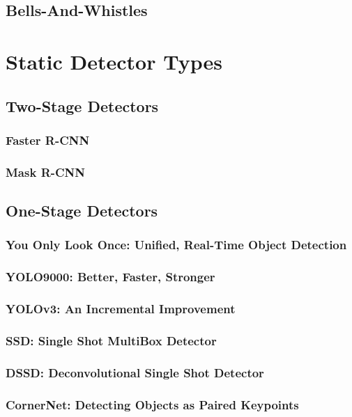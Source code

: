 \documentclass[12pt, letterpaper, twoside]{article}
\begin{document}
\subsection{Bells-And-Whistles}

\section{Static Detector Types}

\vfill

\subsection{Two-Stage Detectors}
\subsubsection{Faster R-CNN}
\subsubsection{Mask R-CNN}

\subsection{One-Stage Detectors}
\subsubsection{You Only Look Once: Unified, Real-Time Object Detection}
\subsubsection{YOLO9000: Better, Faster, Stronger}
\subsubsection{YOLOv3: An Incremental Improvement}
\subsubsection{SSD: Single Shot MultiBox Detector}
\subsubsection{DSSD: Deconvolutional Single Shot Detector}
\subsubsection{CornerNet: Detecting Objects as Paired Keypoints}
\end{document}
